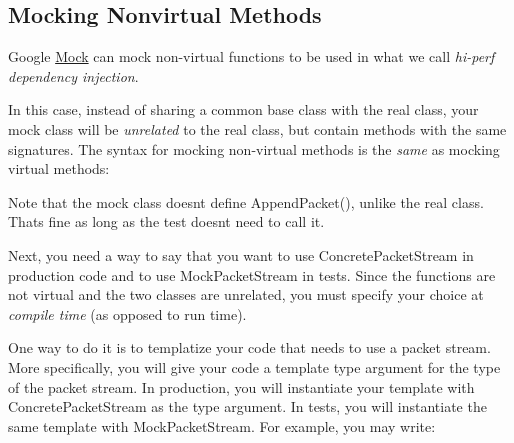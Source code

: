 \subsection*{Mocking Nonvirtual Methods}

Google \mbox{\hyperlink{class_mock}{Mock}} can mock non-\/virtual functions to be used in what we call {\itshape hi-\/perf dependency injection}.

In this case, instead of sharing a common base class with the real class, your mock class will be {\itshape unrelated} to the real class, but contain methods with the same signatures. The syntax for mocking non-\/virtual methods is the {\itshape same} as mocking virtual methods\+:


\begin{DoxyCode}{0}
\DoxyCodeLine{\};}
\DoxyCodeLine{}
\DoxyCodeLine{\};}
\end{DoxyCode}


Note that the mock class doesn\textquotesingle{}t define {\ttfamily Append\+Packet()}, unlike the real class. That\textquotesingle{}s fine as long as the test doesn\textquotesingle{}t need to call it.

Next, you need a way to say that you want to use {\ttfamily Concrete\+Packet\+Stream} in production code and to use {\ttfamily Mock\+Packet\+Stream} in tests. Since the functions are not virtual and the two classes are unrelated, you must specify your choice at {\itshape compile time} (as opposed to run time).

One way to do it is to templatize your code that needs to use a packet stream. More specifically, you will give your code a template type argument for the type of the packet stream. In production, you will instantiate your template with {\ttfamily Concrete\+Packet\+Stream} as the type argument. In tests, you will instantiate the same template with {\ttfamily Mock\+Packet\+Stream}. For example, you may write\+:


